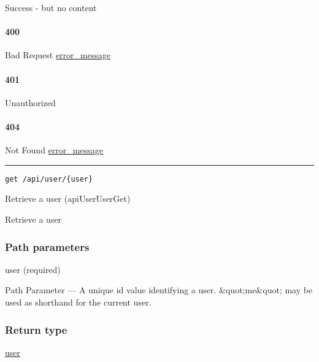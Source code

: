 Success - but no content \protect\hyperlink{}{}

\hypertarget{section-485}{%
\paragraph{400}\label{section-485}}

Bad Request \protect\hyperlink{error_message}{error\_message}

\hypertarget{section-486}{%
\paragraph{401}\label{section-486}}

Unauthorized \protect\hyperlink{}{}

\hypertarget{section-487}{%
\paragraph{404}\label{section-487}}

Not Found \protect\hyperlink{error_message}{error\_message}

\begin{center}\rule{0.5\linewidth}{\linethickness}\end{center}

\protect\hypertarget{apiUserUserGet}{}{}

\begin{verbatim}
get /api/user/{user}
\end{verbatim}

Retrieve a user ({apiUserUserGet})

Retrieve a user

\hypertarget{path-parameters-81}{%
\subsubsection{Path parameters}\label{path-parameters-81}}

user (required)

{Path Parameter} --- A unique id value identifying a user.
\&quot;me\&quot; may be used as shorthand for the current user.

\hypertarget{return-type-115}{%
\subsubsection{Return type}\label{return-type-115}}

\protect\hyperlink{user}{user}

